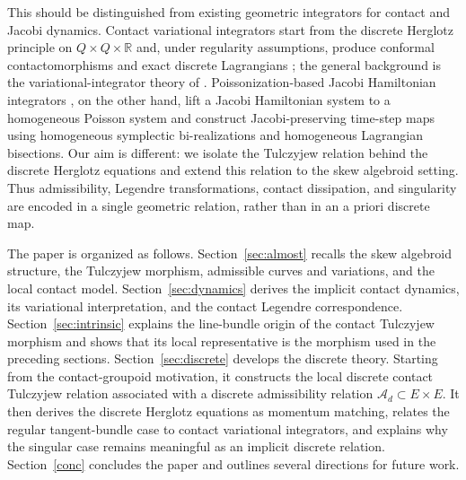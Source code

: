 \documentclass[11pt]{article}
\newcommand{\R}{\mathbb{R}}
\newcommand{\mc}[1]{\mathcal{#1}}
\begin{document}
This should be distinguished from existing geometric integrators for contact and
Jacobi dynamics. Contact variational integrators start from the discrete Herglotz
principle on \(Q\times Q\times\R\) and, under regularity assumptions, produce
conformal contactomorphisms and exact discrete Lagrangians
\cite{VermeerenBravettiSeri2019,SimoesMartinDeDiegoLainzDeLeon2021}; the general
background is the variational-integrator theory of \cite{MarsdenWest2001}.
Poissonization-based Jacobi Hamiltonian integrators \cite{AraujoOliveiraMestre2026}, on the other hand, lift a
Jacobi Hamiltonian system to a homogeneous Poisson system and construct
Jacobi-preserving time-step maps using homogeneous symplectic bi-realizations and
homogeneous Lagrangian bisections. Our aim is different: we isolate the
Tulczyjew relation behind the discrete Herglotz equations and extend this
relation to the skew algebroid setting. Thus admissibility, Legendre
transformations, contact dissipation, and singularity are encoded in a single
geometric relation, rather than in an a priori discrete map.


The paper is organized as follows. Section~\ref{sec:almost} recalls the skew algebroid
structure, the Tulczyjew morphism, admissible curves and variations, and the local
contact model. Section~\ref{sec:dynamics} derives the implicit contact dynamics, its variational
interpretation, and the contact Legendre correspondence. Section~\ref{sec:intrinsic} explains the
line-bundle origin of the contact Tulczyjew morphism and shows that its local
representative is the morphism used in the preceding sections. Section~\ref{sec:discrete} develops the discrete theory. Starting from the contact-groupoid
motivation, it constructs the local discrete contact Tulczyjew relation
associated with a discrete admissibility relation \(\mc A_d\subset E\times E\).
It then derives the discrete Herglotz equations as momentum matching, relates
the regular tangent-bundle case to contact variational integrators, and explains
why the singular case remains meaningful as an implicit discrete relation. Section~\ref{conc} concludes the paper and outlines several directions for
future work.
\end{document}
